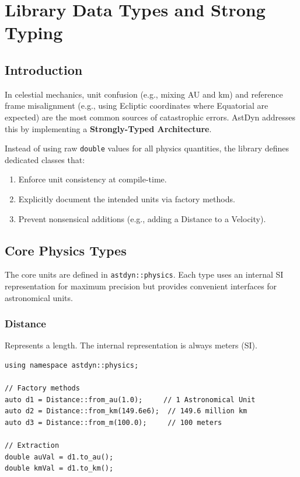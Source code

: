\chapter{Library Data Types and Strong Typing}
\label{ch:data_types}

\section{Introduction}

In celestial mechanics, unit confusion (e.g., mixing AU and km) and reference frame misalignment (e.g., using Ecliptic coordinates where Equatorial are expected) are the most common sources of catastrophic errors. AstDyn addresses this by implementing a \textbf{Strongly-Typed Architecture}.

Instead of using raw \texttt{double} values for all physics quantities, the library defines dedicated classes that:
\begin{enumerate}
    \item Enforce unit consistency at compile-time.
    \item Explicitly document the intended units via factory methods.
    \item Prevent nonsensical additions (e.g., adding a Distance to a Velocity).
\end{enumerate}

\section{Core Physics Types}

The core units are defined in \texttt{astdyn::physics}. Each type uses an internal SI representation for maximum precision but provides convenient interfaces for astronomical units.

\subsection{Distance}
Represents a length. The internal representation is always meters (SI).

\begin{lstlisting}[style=cpp, caption={Using the Distance type}]
using namespace astdyn::physics;

// Factory methods
auto d1 = Distance::from_au(1.0);     // 1 Astronomical Unit
auto d2 = Distance::from_km(149.6e6);  // 149.6 million km
auto d3 = Distance::from_m(100.0);     // 100 meters

// Extraction
double auVal = d1.to_au();
double kmVal = d1.to_km();
\end{lstlisting}

